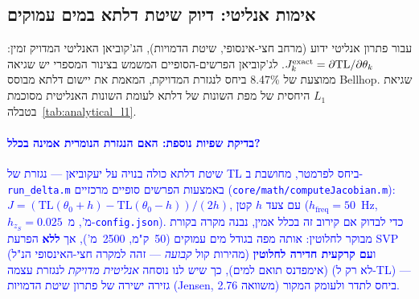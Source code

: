 \documentclass[12pt,a4paper]{article}
\DeclareRobustCommand{\aiedit}[1]{\textcolor{blue}{#1}}
\begin{document}
\subsection{אימות אנליטי: דיוק שיטת דלתא במים עמוקים}
\label{sec:analytical_gt}

עבור פתרון אנליטי ידוע (מרחב חצי-אינסופי, שיטת הדמויות), הג'קוביאן האנליטי המדויק זמין:
$J_k^{\rm exact} = \partial \mathrm{TL} / \partial \theta_k$.
לג'קוביאן הפרשים-הסופיים המשמש בצינור המספרי יש שגיאה ממוצעת של 8.47\%{}
ביחס לנגזרת המדויקת, המאמת את יישום דלתא מבוסס \textenglish{Bellhop}.
שגיאת $L_1$ היחסית של מפת השונות של דלתא לעומת השונות האנליטית
מסוכמת בטבלה~\ref{tab:analytical_l1}.

\aiedit{
\paragraph{בדיקת שפיות נוספת: האם הנגזרת הנומרית אמינה בכלל?}
שיטת דלתא כולה בנויה על יעקוביאן — נגזרת של TL ביחס לפרמטר, מחושבת ב-\texttt{run\_delta.m}
באמצעות הפרשים סופיים מרכזיים (\texttt{core/math/computeJacobian.m}): $J=(\mathrm{TL}(\theta_0+h)-\mathrm{TL}(\theta_0-h))/(2h)$,
עם צעד $h$ קטן ($h_{\mathrm{freq}}=50$~Hz, $h_{z_S}=0.025$~מ', מ-\texttt{config.json}).
כדי לבדוק אם קירוב זה בכלל אמין, נבנה מקרה בקורת מבוקר לחלוטין: אותה מפה בגודל
מים עמוקים (50~ק"מ, 2500~מ'), אך \textbf{ללא} הפרעת SVP (מהירות קול \emph{קבועה} —
זהה למקרה חצי-האינסופי הנ"ל) ו\textbf{עם קרקעית חדירה לחלוטין} (אימפדנס תואם למים),
כך שיש לנו נוסחה \emph{אנליטית מדויקת} לנגזרת עצמה (לא רק ל-TL) — גזירה ישירה
של פתרון שיטת הדמויות (Jensen, משוואה 2.76) ביחס לתדר ולעומק המקור.
}
\end{document}
